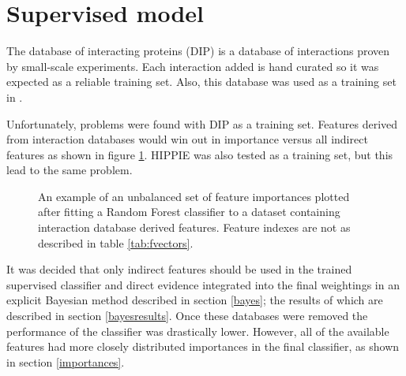
\section{Supervised model}
\label{gold}


The database of interacting proteins (\ac{DIP}) is a database of interactions proven by small-scale experiments\autocite{xenarios_dip_2002}.
Each interaction added is hand curated so it was expected as a reliable training set.
Also, this database was used as a training set in \textcite{qi_evaluation_2006}.

Unfortunately, problems were found with \ac{DIP} as a training set. 
Features derived from interaction databases would win out in importance versus all indirect features as shown in figure \ref{fig:unbalanced}.
\ac{HIPPIE} was also tested as a training set, but this lead to the same problem.

\begin{figure}
    \centering
    \setlength\figureheight{3in}
    \setlength\figurewidth{4in}
    \caption{An example of an unbalanced set of feature importances plotted after fitting a Random Forest classifier to a dataset containing interaction database derived features. Feature indexes are not as described in table \ref{tab:fvectors}.}
    \label{fig:unbalanced}
\end{figure}

It was decided that only indirect features should be used in the trained supervised classifier and direct evidence integrated into the final weightings in an explicit Bayesian method described in section \ref{bayes}; the results of which are described in section \ref{bayesresults}.
Once these databases were removed the performance of the classifier was drastically lower.
However, all of the available features had more closely distributed importances in the final classifier, as shown in section \ref{importances}.


